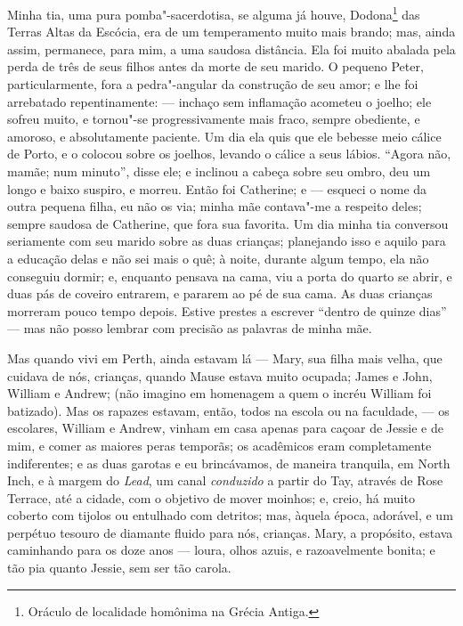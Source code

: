 Minha tia, uma pura pomba"-sacerdotisa, se alguma já houve,
Dodona\footnote{Oráculo de localidade homônima na Grécia Antiga.} das Terras Altas da Escócia, era de um temperamento muito mais
brando; mas, ainda assim, permanece, para mim, a uma saudosa distância.
Ela foi muito abalada pela perda de três de seus filhos antes da morte
de seu marido. O pequeno Peter, particularmente, fora a pedra"-angular da
construção de seu amor; e lhe foi arrebatado repentinamente: --- inchaço
sem inflamação acometeu o joelho; ele sofreu muito, e tornou"-se
progressivamente mais fraco, sempre obediente, e amoroso, e
absolutamente paciente. Um dia ela quis que ele bebesse meio cálice de
Porto, e o colocou sobre os joelhos, levando o cálice a seus lábios.
``Agora não, mamãe; num minuto'', disse ele; e inclinou a cabeça sobre
seu ombro, deu um longo e baixo suspiro, e morreu. Então foi Catherine;
e --- esqueci o nome da outra pequena filha, eu não os via; minha mãe
contava"-me a respeito deles; sempre saudosa de Catherine, que fora sua
favorita. Um dia minha tia conversou seriamente com seu marido sobre as
duas crianças; planejando isso e aquilo para a educação delas e não sei
mais o quê; à noite, durante algum tempo, ela não conseguiu dormir; e,
enquanto pensava na cama, viu a porta do quarto se abrir, e duas pás de
coveiro entrarem, e pararem ao pé de sua cama. As duas crianças morreram
pouco tempo depois. Estive prestes a escrever ``dentro de quinze dias''
--- mas não posso lembrar com precisão as palavras de minha mãe.

Mas quando vivi em Perth, ainda estavam lá --- Mary, sua filha mais
velha, que cuidava de nós, crianças, quando Mause estava muito ocupada;
James e John, William e Andrew; (não imagino em homenagem a quem o
incréu William foi batizado). Mas os rapazes estavam, então, todos na
escola ou na faculdade, --- os escolares, William e Andrew, vinham em
casa apenas para caçoar de Jessie e de mim, e comer as maiores peras
temporãs; os acadêmicos eram completamente indiferentes; e as duas
garotas e eu brincávamos, de maneira tranquila, em North Inch, e à
margem do \textit{Lead}, um canal \textit{conduzido} a partir do Tay, através de
Rose Terrace, até a cidade, com o objetivo de mover moinhos; e, creio,
há muito coberto com tijolos ou entulhado com detritos; mas, àquela
época, adorável, e um perpétuo tesouro de diamante fluido para nós,
crianças. Mary, a propósito, estava caminhando para os doze anos ---
loura, olhos azuis, e razoavelmente bonita; e tão pia quanto Jessie, sem
ser tão carola.

